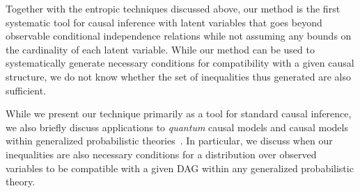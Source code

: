 Together with the entropic techniques discussed above, our method is the first systematic tool for causal inference with latent variables that goes beyond observable conditional independence relations while not assuming any bounds on the cardinality of each latent variable. While our method can be used to systematically generate necessary conditions for compatibility with a given causal structure, we do not know whether the set of inequalities thus generated are also sufficient.  



While we present our technique primarily as a tool for standard causal inference, we also briefly discuss applications to {\em quantum} causal models and causal models within generalized probabilistic theories~\cite{fritz2012bell,pusey2014gdag,chaves2014informationinference,BeyondBellII}.  In particular, we discuss when our inequalities are also necessary conditions for a distribution over observed variables to be compatible with a given DAG within any generalized probabilistic theory. 




